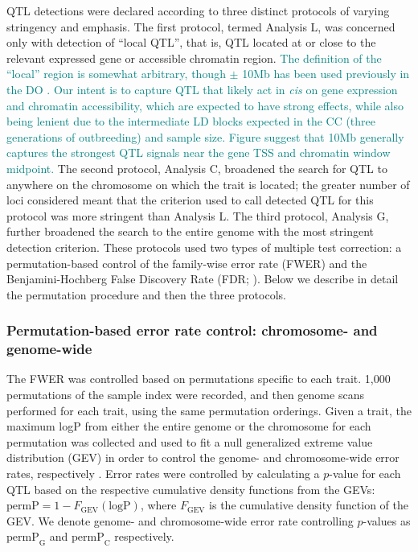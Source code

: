 \documentclass[10pt,letterpaper]{article}
\newcommand{\permpc}{\text{permP}_{\text{C}}}
\newcommand{\permpg}{\text{permP}_{\text{G}}}
\newcommand{\GKinline}[1]{\textcolor{teal}{#1}}
\begin{document}
QTL detections were declared according to three distinct protocols of varying stringency and emphasis. The first protocol, termed Analysis L, was concerned only with detection of ``local QTL'', that is, QTL located at or close to the relevant expressed gene or accessible chromatin region. \GKinline{The definition of the ``local'' region is somewhat arbitrary, though $\pm$ 10Mb has been used previously in the DO \cite{Chick2016}. Our intent is to capture QTL that likely act in \textit{cis} on gene expression and chromatin accessibility, which are expected to have strong effects, while also being lenient due to the intermediate LD blocks expected in the CC (three generations of outbreeding) and sample size. Figure \nameref{S_dist} suggest that 10Mb generally captures the strongest QTL signals near the gene TSS and chromatin window midpoint.}
The second protocol, Analysis C, broadened the search for QTL to anywhere on the chromosome on which the trait is located; the greater number of loci considered meant that the criterion used to call detected QTL for this protocol was more stringent than Analysis L.
The third protocol, Analysis G, further broadened the search to the entire genome with the most stringent detection criterion.
These protocols used two types of multiple test correction: a permutation-based control of the family-wise error rate (FWER) and the Benjamini-Hochberg False Discovery Rate (FDR; \cite{Benjamini1995}). Below we describe in detail the permutation procedure and then the three protocols.

\subsubsection*{Permutation-based error rate control: chromosome- and genome-wide}

The FWER was controlled based on permutations specific to each trait. 1,000 permutations of the sample index were recorded, and then genome scans performed for each trait, using the same permutation orderings. Given a trait, the maximum logP from either the entire genome or the chromosome for each permutation was collected and used to fit a null generalized extreme value distribution (GEV) in order to control the genome- and chromosome-wide error rates, respectively \cite{Dudbridge2004}. 
Error rates were controlled by calculating a $p$-value for each QTL based on the respective cumulative density functions from the GEVs: $\text{permP} = 1 - F_{\text{GEV}}(\text{logP})$, where $F_{\text{GEV}}$ is the cumulative density function of the GEV. We denote genome- and chromosome-wide error rate controlling  $p$-values as $\permpg$ and $\permpc$ respectively.
\end{document}
